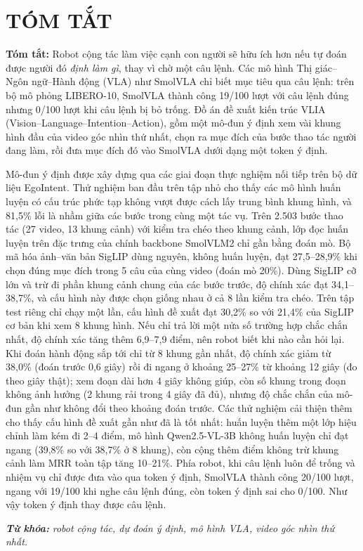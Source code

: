 \documentclass[a4paper,oneside]{report}
\begin{document}
\setcounter{page}{1}

\chapter*{TÓM TẮT}
{\fontsize{12}{15}\selectfont{}
\textbf{Tóm tắt:} Robot cộng tác làm việc cạnh con người sẽ hữu ích hơn nếu tự đoán được người đó \textit{định làm gì}, thay vì chờ một câu lệnh. Các mô hình Thị giác--Ngôn ngữ--Hành động (VLA) như SmolVLA chỉ biết mục tiêu qua câu lệnh: trên bộ mô phỏng LIBERO-10, SmolVLA thành công 19/100 lượt với câu lệnh đúng nhưng 0/100 lượt khi câu lệnh bị bỏ trống. Đồ án đề xuất kiến trúc VLIA (Vision--Language--Intention--Action), gồm một mô-đun ý định xem vài khung hình đầu của video góc nhìn thứ nhất, chọn ra mục đích của bước thao tác người đang làm, rồi đưa mục đích đó vào SmolVLA dưới dạng một token ý định.

Mô-đun ý định được xây dựng qua các giai đoạn thực nghiệm nối tiếp trên bộ dữ liệu EgoIntent. Thử nghiệm ban đầu trên tập nhỏ cho thấy các mô hình huấn luyện có cấu trúc phức tạp không vượt được cách lấy trung bình khung hình, và 81,5\% lỗi là nhầm giữa các bước trong cùng một tác vụ. Trên 2.503 bước thao tác (27 video, 13 khung cảnh) với kiểm tra chéo theo khung cảnh, lớp đọc huấn luyện trên đặc trưng của chính backbone SmolVLM2 chỉ gần bằng đoán mò. Bộ mã hóa ảnh--văn bản SigLIP dùng nguyên, không huấn luyện, đạt 27,5--28,9\% khi chọn đúng mục đích trong 5 câu của cùng video (đoán mò 20\%). Dùng SigLIP cỡ lớn và trừ đi phần khung cảnh chung của các bước trước, độ chính xác đạt 34,1--38,7\%, và cấu hình này được chọn giống nhau ở cả 8 lần kiểm tra chéo. Trên tập test riêng chỉ chạy một lần, cấu hình đề xuất đạt 30,2\% so với 21,4\% của SigLIP cơ bản khi xem 8 khung hình. Nếu chỉ trả lời một nửa số trường hợp chắc chắn nhất, độ chính xác tăng thêm 6,9--7,9 điểm, nên robot biết khi nào cần hỏi lại. Khi đoán hành động sắp tới chỉ từ 8 khung gần nhất, độ chính xác giảm từ 38,0\% (đoán trước 0,6 giây) rồi đi ngang ở khoảng 25--27\% từ khoảng 12 giây (đo theo giây thật); xem đoạn dài hơn 4 giây không giúp, còn số khung trong đoạn không ảnh hưởng (2 khung rải trong 4 giây đã đủ), nhưng độ chắc chắn của mô-đun gần như không đổi theo khoảng đoán trước. Các thử nghiệm cải thiện thêm cho thấy cấu hình đề xuất gần như đã là tốt nhất: huấn luyện thêm một lớp hiệu chỉnh làm kém đi 2--4 điểm, mô hình Qwen2.5-VL-3B không huấn luyện chỉ đạt ngang (39,8\% so với 38,7\% ở 8 khung), còn cộng thêm điểm không trừ khung cảnh làm MRR toàn tập tăng 10--21\%. Phía robot, khi câu lệnh luôn để trống và nhiệm vụ chỉ được đưa vào qua token ý định, SmolVLA thành công 20/100 lượt, ngang với 19/100 khi nghe câu lệnh đúng, còn token ý định sai cho 0/100. Như vậy token ý định thay được câu lệnh.

\vspace{6pt}
\noindent\textbf{\textit{Từ khóa:}} \textit{robot cộng tác, dự đoán ý định, mô hình VLA, video góc nhìn thứ nhất.}\par}
\end{document}
